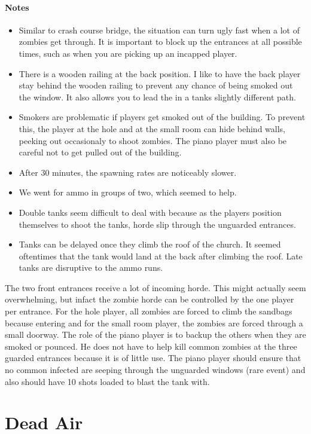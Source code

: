 \paragraph{Notes}
\begin{itemize}
\item Similar to crash course bridge, the situation can turn ugly fast when a lot of zombies get through. It is important to block up the entrances at all possible times, such as when you are picking up an incapped player.
\item There is a wooden railing at the back position. I like to have the back player stay behind the wooden railing to prevent any chance of being smoked out the window. It also allows you to lead the in a tanks slightly different path.
\item Smokers are problematic if players get smoked out of the building. To prevent this, the player at the hole and at the small room can hide behind walls, peeking out occasionaly to shoot zombies. The piano player must also be careful not to get pulled out of the building.
\item After 30 minutes, the spawning rates are noticeably slower.
\item We went for ammo in groups of two, which seemed to help.
\item Double tanks seem difficult to deal with because as the players position themselves to shoot the tanks, horde slip through the unguarded entrances.
\item Tanks can be delayed once they climb the roof of the church. It seemed oftentimes that the tank would land at the back after climbing the roof. Late tanks are disruptive to the ammo runs.
\end{itemize}

The two front entrances receive a lot of incoming horde. This might actually seem overwhelming, but infact the zombie horde can be controlled by the one player per entrance. For the hole player, all zombies are forced to climb the sandbags because entering and for the small room player, the zombies are forced through a small doorway. The role of the piano player is to backup the others when they are smoked or pounced. He does not have to help kill common zombies at the three guarded entrances because it is of little use. The piano player should ensure that no common infected are seeping through the unguarded windows (rare event) and also should have 10 shots loaded to blast the tank with.

\section{Dead Air}

